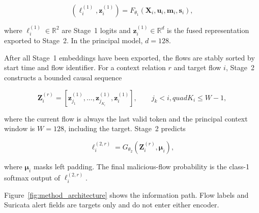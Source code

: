 \begin{equation}
    \left(\boldsymbol{\ell}^{(1)}_i,\mathbf{z}^{(1)}_i\right)
    =F_{\theta_1}
    \left(
        \mathbf{X}_i,\mathbf{u}_i,\mathbf{m}_i,\mathbf{s}_i
    \right),
    \label{eq:method_stage1_mapping}
\end{equation}

where $\boldsymbol{\ell}^{(1)}_i\in\mathbb{R}^{2}$ are Stage~1 logits and
$\mathbf{z}^{(1)}_i\in\mathbb{R}^{d}$ is the fused representation exported to
Stage~2. In the principal model, $d=128$.

After all Stage~1 embeddings have been exported, the flows are stably sorted by
start time and flow identifier. For a context relation $r$ and target flow $i$,
Stage~2 constructs a bounded causal sequence

\begin{equation}
    \mathbf{Z}^{(r)}_i=
    \left[
        \mathbf{z}^{(1)}_{j_1},\ldots,
        \mathbf{z}^{(1)}_{j_{K_i}},
        \mathbf{z}^{(1)}_i
    \right],
    \qquad j_k<i,quad K_i\leq W-1,
    \label{eq:method_stage2_input}
\end{equation}

where the current flow is always the last valid token and the principal context
window is $W=128$, including the target. Stage~2 predicts

\begin{equation}
    \boldsymbol{\ell}^{(2,r)}_i
    =G_{\theta_2}
    \left(\mathbf{Z}^{(r)}_i,\boldsymbol{\mu}_i\right),
    \label{eq:method_stage2_mapping}
\end{equation}

where $\boldsymbol{\mu}_i$ masks left padding. The final malicious-flow
probability is the class-1 softmax output of
$\boldsymbol{\ell}^{(2,r)}_i$.

Figure~\ref{fig:method_architecture} shows the information path. Flow labels
and Suricata alert fields are targets only and do not enter either encoder.

